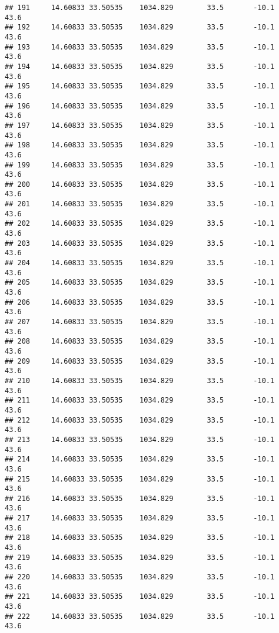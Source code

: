 \documentclass[]{article}
\begin{document}
\begin{verbatim}
## 191     14.60833 33.50535    1034.829        33.5       -10.1              43.6
## 192     14.60833 33.50535    1034.829        33.5       -10.1              43.6
## 193     14.60833 33.50535    1034.829        33.5       -10.1              43.6
## 194     14.60833 33.50535    1034.829        33.5       -10.1              43.6
## 195     14.60833 33.50535    1034.829        33.5       -10.1              43.6
## 196     14.60833 33.50535    1034.829        33.5       -10.1              43.6
## 197     14.60833 33.50535    1034.829        33.5       -10.1              43.6
## 198     14.60833 33.50535    1034.829        33.5       -10.1              43.6
## 199     14.60833 33.50535    1034.829        33.5       -10.1              43.6
## 200     14.60833 33.50535    1034.829        33.5       -10.1              43.6
## 201     14.60833 33.50535    1034.829        33.5       -10.1              43.6
## 202     14.60833 33.50535    1034.829        33.5       -10.1              43.6
## 203     14.60833 33.50535    1034.829        33.5       -10.1              43.6
## 204     14.60833 33.50535    1034.829        33.5       -10.1              43.6
## 205     14.60833 33.50535    1034.829        33.5       -10.1              43.6
## 206     14.60833 33.50535    1034.829        33.5       -10.1              43.6
## 207     14.60833 33.50535    1034.829        33.5       -10.1              43.6
## 208     14.60833 33.50535    1034.829        33.5       -10.1              43.6
## 209     14.60833 33.50535    1034.829        33.5       -10.1              43.6
## 210     14.60833 33.50535    1034.829        33.5       -10.1              43.6
## 211     14.60833 33.50535    1034.829        33.5       -10.1              43.6
## 212     14.60833 33.50535    1034.829        33.5       -10.1              43.6
## 213     14.60833 33.50535    1034.829        33.5       -10.1              43.6
## 214     14.60833 33.50535    1034.829        33.5       -10.1              43.6
## 215     14.60833 33.50535    1034.829        33.5       -10.1              43.6
## 216     14.60833 33.50535    1034.829        33.5       -10.1              43.6
## 217     14.60833 33.50535    1034.829        33.5       -10.1              43.6
## 218     14.60833 33.50535    1034.829        33.5       -10.1              43.6
## 219     14.60833 33.50535    1034.829        33.5       -10.1              43.6
## 220     14.60833 33.50535    1034.829        33.5       -10.1              43.6
## 221     14.60833 33.50535    1034.829        33.5       -10.1              43.6
## 222     14.60833 33.50535    1034.829        33.5       -10.1              43.6

\end{verbatim}
\end{document}
